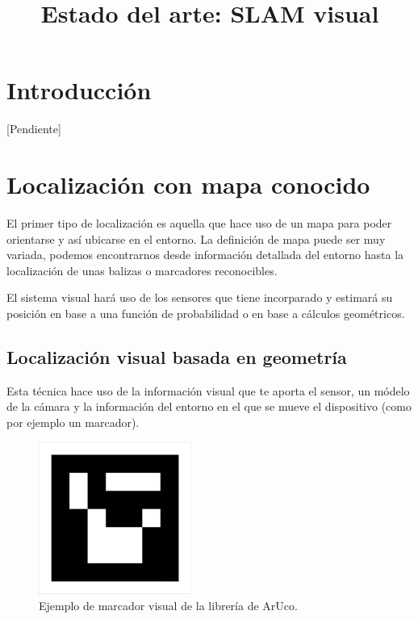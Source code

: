 \documentclass{bmvc2k}
\title{Estado del arte: SLAM visual}
\begin{document}
\maketitle




\section{Introducción}

[Pendiente]

\section{Localización con mapa conocido}
El primer tipo de localización es aquella que hace uso de un mapa para poder orientarse y así ubicarse en el entorno. La definición de mapa puede ser muy variada, podemos encontrarnos desde información detallada del entorno hasta la localización de unas balizas o marcadores reconocibles.

El sistema visual hará uso de los sensores que tiene incorparado y estimará su posición en base a una función de probabilidad o en base a cálculos geométricos$  $.

\subsection{Localización visual basada en geometría}
Esta técnica hace uso de la información visual que te aporta el sensor, un módelo de la cámara y la información del entorno en el que se mueve el dispositivo (como por ejemplo un marcador).

\begin{figure}[H]
	\centering\includegraphics[width=5cm]{images/marker.png}
	\caption{Ejemplo de marcador visual de la librería de ArUco.}
	\label{fig:aruco}
\end{figure}
\end{document}
